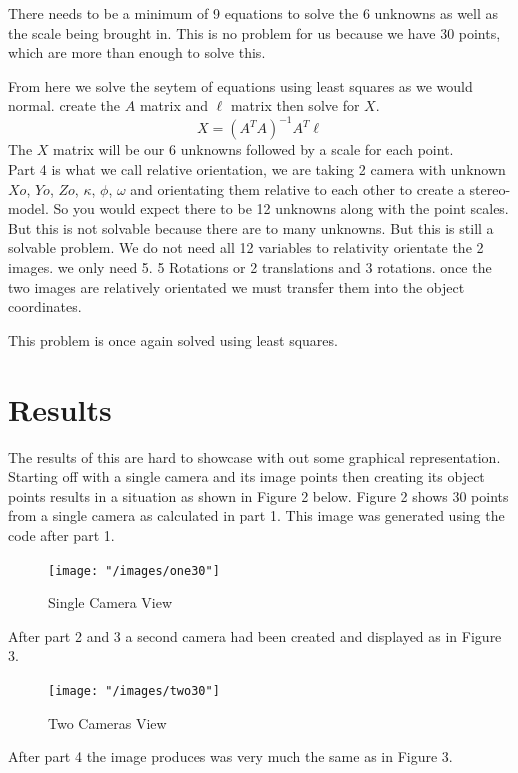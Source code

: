 \documentclass[11pt,a4paper]{article}
\begin{document}
	There needs to be a minimum of 9 equations to solve the 6 unknowns as well as the scale being brought in. This is no problem for us because we have 30 points, which are more than enough to solve this.
	
	From here we solve the seytem of equations using least squares as we would normal. create the $A$ matrix and $\ell$ matrix then solve for $X$.
	\begin{equation}
	X = (A^T A)^{-1} A^T\ell
	\end{equation}
	The $X$ matrix will be our 6 unknowns followed by a scale for each point.\\
	
	Part 4 is what we call relative orientation, we are taking 2 camera with unknown $Xo$, $Yo$, $Zo$, $\kappa$, $\phi$, $\omega$ and orientating them relative to each other to create a stereo-model. So you would expect there to be 12 unknowns along with the point scales. But this is not solvable because there are to many unknowns. But this is still a solvable problem.
	We do not need all 12 variables to relativity orientate the 2 images. we only need 5. 5 Rotations or 2 translations and 3 rotations. once the two images are relatively orientated we must transfer them into the object coordinates.
	
	This problem is once again solved using least squares.
	
	
	\section{Results}
	
	The results of this are hard to showcase with out some graphical representation. Starting off with a single camera and its image points then creating its object points results in a situation as shown in Figure 2 below. Figure 2 shows 30 points from a single camera as calculated in part 1. This image was generated using the code after part 1. 
	
	\begin{figure}[H]
		\centering
		\texttt{[image: "/images/one30"]}
		\caption{Single Camera View}
		\label{fig:oneimage}
	\end{figure}
	
	After part 2 and 3 a second camera had been created and displayed as in Figure 3.
		
	\begin{figure}[H]
		\centering
		\texttt{[image: "/images/two30"]}
		\caption{Two Cameras View }
		\label{fig:twoimages}
	\end{figure}
	
	After part 4 the image produces was very much the same as in Figure 3.
	
\end{document}
